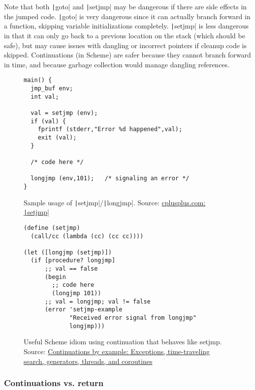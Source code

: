 \documentclass[]{article}
\begin{document}
Note that both \texttt|goto| and \texttt|setjmp| may be dangerous if there are side effects in the jumped code. \texttt|goto| is very dangerous since it can actually branch forward in a function, skipping variable initializations completely. \texttt|setjmp| is less dangerous in that it can only go back to a previous location on the stack (which should be safe), but may cause issues with dangling or incorrect pointers if cleanup code is skipped. Continuations (in Scheme) are safer because they cannot branch forward in time, and because garbage collection would manage dangling references.

\begin{figure}[h]
  \centering
\begin{verbatim}
main() {
  jmp_buf env;
  int val;

  val = setjmp (env);
  if (val) {
    fprintf (stderr,"Error %d happened",val);
    exit (val);
  }

  /* code here */

  longjmp (env,101);   /* signaling an error */
}
\end{verbatim}
  \caption{Sample usage of \texttt|setjmp|/\texttt|longjmp|. Source: \href{http://www.cplusplus.com/reference/csetjmp/setjmp/}{cplusplus.com: \texttt|setjmp|}}
  \label{fig:setj}
\end{figure}

\begin{figure}[h]
  \centering
\begin{verbatim}
(define (setjmp)
  (call/cc (lambda (cc) (cc cc))))

(let ([longjmp (setjmp)])
  (if [procedure? longjmp]
      ;; val == false
      (begin
        ;; code here
        (longjmp 101))
      ;; val = longjmp; val != false
      (error 'setjmp-example
             "Received error signal from longjmp"
             longjmp)))
\end{verbatim}
  \caption{Useful Scheme idiom using continuation that behaves like setjmp. Source: \href{https://matt.might.net/articles/programming-with-continuations--exceptions-backtracking-search-threads-generators-coroutines/}{Continuations by example: Exceptions, time-traveling search, generators, threads, and coroutines}}
  \label{fig:idio}
\end{figure}

\subsubsection{Continuations vs. return}
\label{sec:retu}
\end{document}
